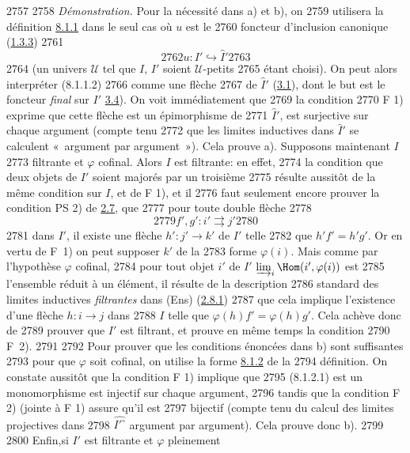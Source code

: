   2757	
  2758	\noindent \emph{Démonstration.} Pour la nécessité dans a) et b), on
  2759	utilisera la définition \hyperref[I.def8.1.1]{8.1.1} dans le seul cas où $u$ est le
  2760	foncteur d'inclusion canonique (\hyperref[I.sec1.3.3]{1.3.3})
  2761	$$
  2762	u:I'\hookrightarrow \widehat{I}'
  2763	$$
  2764	(un univers $𝒰$ tel que $I$, $I'$ soient $𝒰$-petits
  2765	étant choisi). On peut alors interpréter (8.1.1.2)
  2766	comme une flèche
  2767	de $\widehat{I}'$ (\hyperref[I.prop3.1]{3.1}), dont le but est le foncteur	\emph{final} sur $I'$ \hyperref[I.prop3.4]{3.4}). On voit immédiatement que
  2769	la condition
  2770	     F 1) exprime que cette flèche est un épimorphisme de
  2771	$\widehat{I}'$, \ie est surjective sur chaque argument (compte tenu
  2772	que les limites inductives dans $\widehat{I}'$ se calculent « argument par argument »). Cela prouve a). Supposons maintenant $I$
  2773	filtrante et $\varphi$ cofinal. Alors $I$ est filtrante: en effet,
  2774	la condition que deux objets de $I'$ soient majorés par un troisième
  2775	résulte aussitôt de la même condition sur $I$, et de F 1), et il
  2776	faut seulement encore prouver la condition PS 2) de \hyperref[I.def2.7]{2.7}, \ie que
  2777	pour toute double flèche
  2778	$$
  2779	f',g':i'\rightrightarrows j'
  2780	$$
  2781	dans $I'$, il existe une flèche $h':j'\rightarrow k'$ de $I'$ telle
  2782	que $h'f'=h'g'$. Or en vertu de F~1) on peut supposer $k'$ de la
  2783	forme $\varphi(i)$. Mais comme par l'hypothèse $\varphi$ cofinal,
  2784	pour tout objet $i'$ de $I'$\; $\varinjlim_i\Hom(i',\varphi(i))$ est
  2785	l'ensemble réduit à un élément, il résulte de la description
  2786	standard des limites inductives \emph{filtrantes} dans (Ens) (\hyperref[I.lem2.8.1]{2.8.1})
  2787	que cela implique l'existence d'une flèche $h:i\rightarrow j$ dans
  2788	$I$ telle que $\varphi(h)f'=\varphi(h)g'$. Cela achève donc de
  2789	prouver que $I'$ est filtrant, et prouve en même temps la condition
  2790	F~2).
  2791	
  2792	Pour prouver que les conditions énoncées dans b) sont suffisantes
  2793	pour que $\varphi$ soit cofinal, on utilise la forme \hyperref[I.sec8.1.2]{8.1.2} de la
  2794	définition. On constate aussitôt que la condition F 1) implique que
  2795	(8.1.2.1) est un monomorphisme \ie est injectif sur chaque argument,
  2796	tandis que la condition F 2) (jointe à F 1) assure qu'il est
  2797	bijectif (compte tenu du calcul des limites projectives dans
  2798	$\widehat{{I'}^\circ}$ argument par argument). Cela prouve donc b).
  2799	
  2800	Enfin,\pageoriginale si $I'$ est filtrante et $\varphi$ pleinement
